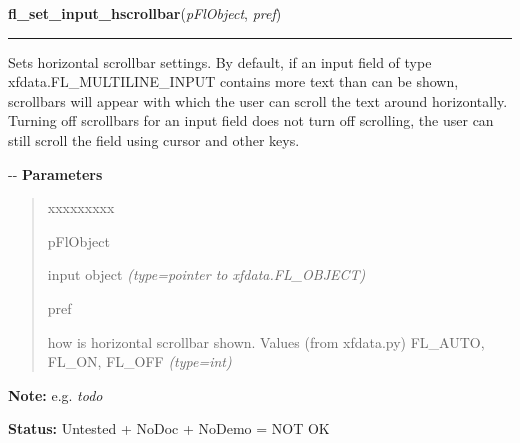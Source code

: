 \hspace{.8\funcindent}\begin{boxedminipage}{\funcwidth}

    \raggedright \textbf{fl\_set\_input\_hscrollbar}(\textit{pFlObject}, \textit{pref})

    \vspace{-1.5ex}

    \rule{\textwidth}{0.5\fboxrule}
\setlength{\parskip}{2ex}

Sets horizontal scrollbar settings. By default, if an input field of
type xfdata.FL\_MULTILINE\_INPUT contains more text than can be shown,
scrollbars will appear with which the user can scroll the text around
horizontally. Turning off scrollbars for an input field does not turn off
scrolling, the user can still scroll the field using cursor and other keys.

-{}-
\setlength{\parskip}{1ex}
      \textbf{Parameters}
      \vspace{-1ex}

      \begin{quote}
        \begin{Ventry}{xxxxxxxxx}

          \item[pFlObject]


input object
            {\it (type=pointer to xfdata.FL\_OBJECT)}

          \item[pref]


how is horizontal scrollbar shown. Values (from xfdata.py) FL\_AUTO,
FL\_ON, FL\_OFF
            {\it (type=int)}

        \end{Ventry}

      \end{quote}

\textbf{Note:} 
e.g. \emph{todo}


\textbf{Status:} 
Untested + NoDoc + NoDemo = NOT OK


    \end{boxedminipage}

    \label{xformslib:flinput:fl_set_input_vscrollbar}

    \vspace{0.5ex}

